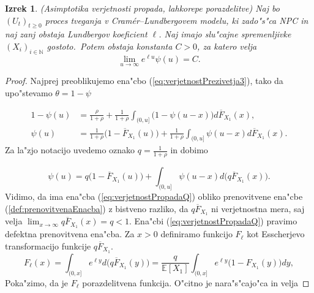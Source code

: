 \documentclass[12pt, a4paper, reqno]{amsart}
\theoremstyle{definition}
\theoremstyle{plain}
\newtheorem{izrek}[definicija]{Izrek}
\newcommand{\N}{\mathbb{N}}
\newcommand{\E}{\mathbb{E}}
\newcommand{\1}{\mathds{1}}
\begin{document}
            \begin{izrek}(Asimptotika verjetnosti propada, lahkorepe porazdelitve)
                Naj bo $(U_t)_{t\geq0}$ proces tveganja v Cramér--Lundbergovem modelu, ki zado"s"ca NPC in 
                naj zanj obstaja Lundbergov koeficient $\ell$. Naj imajo slu"cajne spremenljivke 
                $(X_i)_{i\in\N}$ gostoto.\ Potem obstaja konstanta $C>0$, za katero velja 
                \begin{equation*}
                    \lim_{u\to\infty}e^{\ell u}\psi(u) = C.
                \end{equation*}
                \label{izr:CramerjevaMeja}
            \end{izrek}

            \begin{proof} 
                Najprej preoblikujemo ena"cbo (\ref{eq:verjetnostPrezivetja3}), tako da 
                upo"stevamo $\theta = 1 - \psi$

                \begin{align*}
                    1 - \psi(u) &= \frac{\rho}{1 + \rho} + \frac{1}{1 + \rho}\int_{(0, u]}\bigl(1 - \psi(u - x)\bigr)d\overline{F}_{X_1}(x), \\
                    \psi(u) &= \frac{1}{1 + \rho}\bigl(1 - \overline{F}_{X_1}(u)\bigr) + \frac{1}{1 + \rho}\int_{(0, u]}\psi(u - x)d\overline{F}_{X_1}(x).
                \end{align*}
                Za la"zjo notacijo uvedemo oznako $q = \frac{1}{1 + \rho}$ in dobimo

                \begin{equation}
                    \psi(u) = q\bigl(1 - \overline{F}_{X_1}(u)\bigr) + \int_{(0, u]}\psi(u - x)d\bigl(q\overline{F}_{X_1}(x)\bigr).
                    \label{eq:verjetnostPropadaQ}
                \end{equation}
                Vidimo, da ima ena"cba (\ref{eq:verjetnostPropadaQ}) obliko prenovitvene 
                ena"cbe (\ref{def:prenovitvenaEnacba}) z bistveno razliko, da $q\overline{F}_{X_1}$ ni
                verjetnostna mera, saj velja $\lim_{x\to\infty}q\overline{F}_{X_1}(x) = q < 1$. Ena"cbi 
                (\ref{eq:verjetnostPropadaQ}) pravimo defektna prenovitvena ena"cba. Za $x > 0$ 
                definiramo funkcijo $F_\ell$ kot Esscherjevo transformacijo funkcije $q\overline{F}_{X_1}$.
                \begin{equation*}
                    F_\ell(x) = \int_{(0, x]}e^{\ell y}d\bigl(q\overline{F}_{X_1}(y)\bigr) = \frac{q}{\E\left[X_1\right]}\int_{(0, x]}e^{\ell y}\bigl(1 - F_{X_1}(y)\bigr)dy, 
                \end{equation*}
                Poka"zimo, da je $F_\ell$ porazdelitvena funkcija. O"citno je nara"s"cajo"ca in velja


\end{proof}
\end{document}
